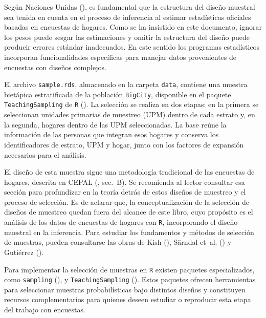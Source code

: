 \documentclass[
  spanish,
  11pt,
  letterpaper,
  oneside,
  open=any]{scrbook}
\begin{document}
Según Naciones Unidas (), es
fundamental que la estructura del diseño muestral sea tenida en cuenta
en el proceso de inferencia al estimar estadísticas oficiales basadas en
encuestas de hogares. Como se ha insistido en este documento, ignorar
los pesos puede sesgar las estimaciones y omitir la estructura del
diseño puede producir errores estándar inadecuados. En este sentido los
programas estadísticos incorporan funcionalidades específicas para
manejar datos provenientes de encuestas con diseños complejos.

El archivo \texttt{sample.rds}, almacenado en la carpeta \texttt{data},
contiene una muestra bietápica estratificada de la población
\texttt{BigCity}, disponible en el paquete \texttt{TeachingSampling} de
\texttt{R} (). La selección
se realiza en dos etapas: en la primera se seleccionan unidades
primarias de muestreo (UPM) dentro de cada estrato y, en la segunda,
hogares dentro de las UPM seleccionadas. La base reúne la información de
las personas que integran esos hogares y conserva los identificadores de
estrato, UPM y hogar, junto con los factores de expansión necesarios
para el análisis.

El diseño de esta muestra sigue una metodología tradicional de las
encuestas de hogares, descrita en CEPAL
(, sec.~B). Se recomienda al
lector consultar esa sección para profundizar en la teoría detrás de
estos diseños de muestreo y el proceso de selección. Es de aclarar que,
la conceptualización de la selección de diseños de muestreo quedan fuera
del alcance de este libro, cuyo propósito es el análisis de los datos de
encuestas de hogares con \texttt{R}, incorporando el diseño muestral en
la inferencia. Para estudiar los fundamentos y métodos de selección de
muestras, pueden consultarse las obras de Kish
(), Särndal et~al.
() y Gutiérrez
().

Para implementar la selección de muestras en \texttt{R} existen paquetes
especializados, como \texttt{sampling}
(), y
\texttt{TeachingSampling} (). Estos paquetes ofrecen herramientas para seleccionar muestras
probabilísticas bajo distintos diseños y constituyen recursos
complementarios para quienes deseen estudiar o reproducir esta etapa del
trabajo con encuestas.
\end{document}
